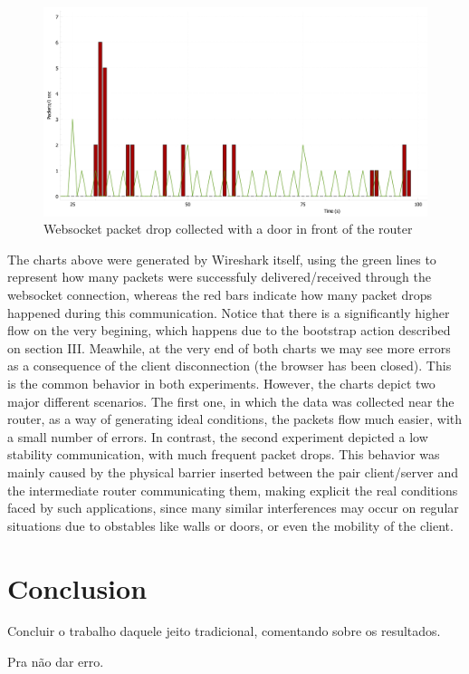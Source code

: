 \documentclass[english]{sbrt}
\begin{document}
\begin{figure}[H]
  \centering
  \includegraphics[width=12cm]{websocket traffic bedroom.jpg}
  \caption{Websocket packet drop collected with a door in front of the router}
  \label{game-diagram}
\end{figure}

The charts above were generated by Wireshark itself, using the green lines to represent
how many packets were successfuly delivered/received through the websocket connection, whereas the
red bars indicate how many packet drops happened during this communication. Notice that there is a significantly
higher flow on the very begining, which happens due to the bootstrap action described on section III. Meawhile, at the very end
of both charts we may see more errors as a consequence of the client disconnection (the browser has been closed). This is the common
behavior in both experiments. However, the charts depict two major different scenarios. The first one, in which the data was collected near
the router, as a way of generating ideal conditions, the packets flow much easier, with a small number of errors. In contrast, the second experiment
depicted a low stability communication, with much frequent packet drops. This behavior was mainly caused by the physical barrier inserted between the pair client/server
and the intermediate router communicating them, making explicit the real conditions faced by such applications, since many similar interferences may occur on regular situations
due to obstables like walls or doors, or even the mobility of the client.
\section{\textbf{Conclusion}}
Concluir o trabalho daquele jeito tradicional, comentando sobre os resultados.

\cite{maodv01} Pra não dar erro.



\end{document}
